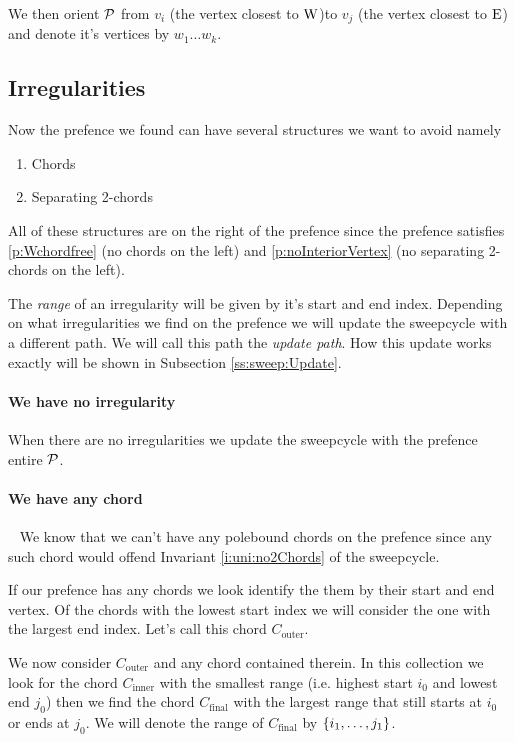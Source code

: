     We then orient $\P$ from $v_i$ (the vertex closest to $\pW$)to $v_j$ (the vertex closest to $\pE$) and denote it's vertices by $w_1 \ldots w_k$.

  \subsection{Irregularities}
    Now the prefence we found can have several structures we want to avoid
    namely
    \begin{enumerate}
      \itemsep=-4pt
      \item Chords
      \item Separating 2-chords
    \end{enumerate}

    All of these structures are on the right of the prefence since the prefence satisfies \ref{p:Wchordfree} (no chords on the left) and \ref{p:noInteriorVertex} (no separating 2-chords on the left).

    The \emph{range} of an irregularity will be given by it's start and end index. Depending on what irregularities we find on the prefence we will update the sweepcycle with a different path. We will call this path the \emph{update path}. How this update works exactly will be shown in Subsection \ref{ss:sweep:Update}.

    \paragraph{We have no irregularity}
      When there are no irregularities we update the sweepcycle with the prefence entire $\P$.

    \paragraph{We have any chord} \mbox{ }
    We know that we can't have any polebound chords on the prefence since any such chord would offend Invariant \ref{i:uni:no2Chords} of the sweepcycle.

    If our prefence has any chords we look identify the them by their start and end vertex. Of the chords with the lowest start index we will consider the one with the largest end index. Let's call this chord $C_\text{outer}$.

    We now consider $C_\text{outer}$ and any chord contained therein. In this collection we look for the chord $C_\text{inner}$ with the smallest range (i.e. highest start $i_0$ and lowest end $j_0$) then we find the chord $C_\text{final}$ with the largest range that still starts at $i_0$ or ends at $j_0$. We will denote the range of $C_\text{final}$ by $\braces{i_1, \ldots, j_1}$.

